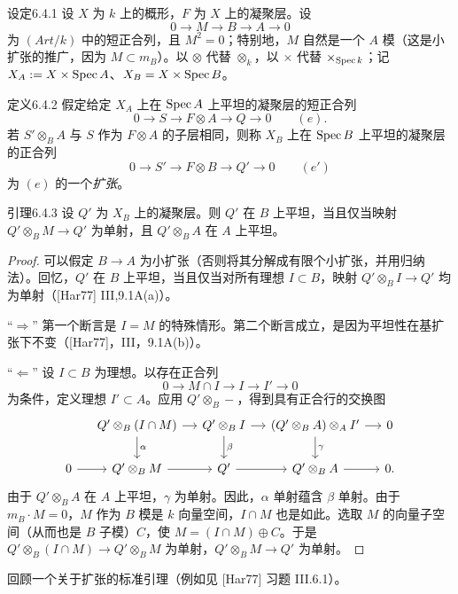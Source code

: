 \begin{origstatement}{设定}{6.4.1}\label{ch06:6.4.1}
设 $X$ 为 $k$ 上的概形，$F$ 为 $X$ 上的凝聚层。设
\[
0\longrightarrow M\longrightarrow B\longrightarrow A\longrightarrow0
\]
为 $(Art/k)$ 中的短正合列，且 $M^2=0$；特别地，$M$ 自然是一个 $A$ 模（这是小扩张的推广，因为 $M\subset m_B$）。以 $\otimes$ 代替 $\otimes_k$，以 $\times$ 代替 $\times_{\operatorname{Spec} k}$；记 $X_A:=X\times\operatorname{Spec} A$、$X_B=X\times\operatorname{Spec} B$。
\end{origstatement}
\begin{origstatement}{定义}{6.4.2}\label{ch06:6.4.2}
假定给定 $X_A$ 上在 $\operatorname{Spec} A$ 上平坦的凝聚层的短正合列
\[
0\longrightarrow S\longrightarrow F\otimes A\longrightarrow Q\longrightarrow0
\qquad(e).
\]
若 $S'\otimes_B A$ 与 $S$ 作为 $F\otimes A$ 的子层相同，则称 $X_B$ 上在 $\operatorname{Spec} B$ 上平坦的凝聚层的正合列
\[
0\longrightarrow S'\longrightarrow F\otimes B\longrightarrow Q'\longrightarrow0
\qquad(e')
\]
为 $(e)$ 的一个\emph{扩张}。
\end{origstatement}
\begin{origstatement}{引理}{6.4.3}\label{ch06:6.4.3}
设 $Q'$ 为 $X_B$ 上的凝聚层。则 $Q'$ 在 $B$ 上平坦，当且仅当映射 $Q'\otimes_B M\to Q'$ 为单射，且 $Q'\otimes_B A$ 在 $A$ 上平坦。
\end{origstatement}
\begin{proof}
可以假定 $B\to A$ 为小扩张（否则将其分解成有限个小扩张，并用归纳法）。回忆，$Q'$ 在 $B$ 上平坦，当且仅当对所有理想 $I\subset B$，映射 $Q'\otimes_B I\to Q'$ 均为单射（[Har77] III,9.1A(a)）。

“$\Rightarrow$” 第一个断言是 $I=M$ 的特殊情形。第二个断言成立，是因为平坦性在基扩张下不变（[Har77]，III，9.1A(b)）。

“$\Leftarrow$” 设 $I\subset B$ 为理想。以存在正合列
\[
0\longrightarrow M\cap I\longrightarrow I\longrightarrow I'\longrightarrow0
\]
为条件，定义理想 $I'\subset A$。应用 $Q'\otimes_B-$，得到具有正合行的交换图
\[
\begin{tikzcd}[column sep=small]
&Q'\otimes_B(I\cap M)\arrow[r]\arrow[d,"\alpha"]&Q'\otimes_B I\arrow[r]\arrow[d,"\beta"]&(Q'\otimes_B A)\otimes_A I'\arrow[r]\arrow[d,"\gamma"]&0\\
0\arrow[r]&Q'\otimes_B M\arrow[r]&Q'\arrow[r]&Q'\otimes_B A\arrow[r]&0.
\end{tikzcd}
\]
由于 $Q'\otimes_B A$ 在 $A$ 上平坦，$\gamma$ 为单射。因此，$\alpha$ 单射蕴含 $\beta$ 单射。由于 $m_B\cdot M=0$，$M$ 作为 $B$ 模是 $k$ 向量空间，$I\cap M$ 也是如此。选取 $M$ 的向量子空间（从而也是 $B$ 子模）$C$，使 $M=(I\cap M)\oplus C$。于是 $Q'\otimes_B(I\cap M)\to Q'\otimes_B M$ 为单射，$Q'\otimes_B M\to Q'$ 为单射。
\end{proof}
回顾一个关于扩张的标准引理（例如见 [Har77] 习题 III.6.1）。

